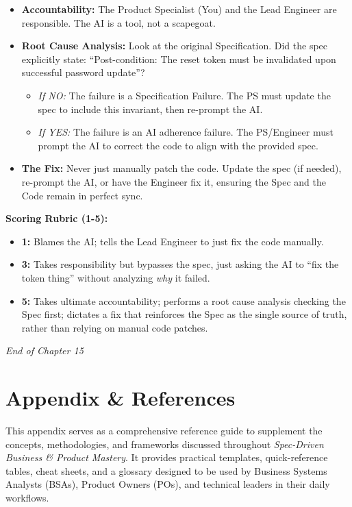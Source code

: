 \begin{itemize}
\tightlist
\item
  \textbf{Accountability:} The Product Specialist (You) and the Lead
  Engineer are responsible. The AI is a tool, not a scapegoat.
\item
  \textbf{Root Cause Analysis:} Look at the original Specification. Did
  the spec explicitly state: ``Post-condition: The reset token must be
  invalidated upon successful password update''?

  \begin{itemize}
  \tightlist
  \item
    \emph{If NO:} The failure is a Specification Failure. The PS must
    update the spec to include this invariant, then re-prompt the AI.
  \item
    \emph{If YES:} The failure is an AI adherence failure. The
    PS/Engineer must prompt the AI to correct the code to align with the
    provided spec.
  \end{itemize}
\item
  \textbf{The Fix:} Never just manually patch the code. Update the spec
  (if needed), re-prompt the AI, or have the Engineer fix it, ensuring
  the Spec and the Code remain in perfect sync.
\end{itemize}

\textbf{Scoring Rubric (1-5):}

\begin{itemize}
\tightlist
\item
  \textbf{1:} Blames the AI; tells the Lead Engineer to just fix the
  code manually.
\item
  \textbf{3:} Takes responsibility but bypasses the spec, just asking
  the AI to ``fix the token thing'' without analyzing \emph{why} it
  failed.
\item
  \textbf{5:} Takes ultimate accountability; performs a root cause
  analysis checking the Spec first; dictates a fix that reinforces the
  Spec as the single source of truth, rather than relying on manual code
  patches.
\end{itemize}

\bigskip

\emph{End of Chapter 15}

\chapter{Appendix \& References}\label{appendix-references}

This appendix serves as a comprehensive reference guide to supplement
the concepts, methodologies, and frameworks discussed throughout
\emph{Spec-Driven Business \& Product Mastery}. It provides practical
templates, quick-reference tables, cheat sheets, and a glossary designed
to be used by Business Systems Analysts (BSAs), Product Owners (POs),
and technical leaders in their daily workflows.

